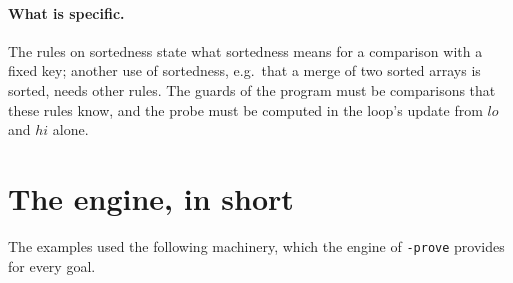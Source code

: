 \documentclass[11pt,a4paper]{article}
\begin{document}
\paragraph{What is specific.} The rules on sortedness state what sortedness means for a comparison with a fixed
key; another use of sortedness, e.g.\ that a merge of two sorted arrays is sorted, needs other rules. The guards of
the program must be comparisons that these rules know, and the probe must be computed in the loop's update from
$lo$ and $hi$ alone.

\section{The engine, in short}

The examples used the following machinery, which the engine of \texttt{-prove} provides for every goal.
\end{document}
